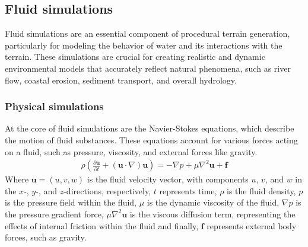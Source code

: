 






\subsection{Fluid simulations}
Fluid simulations are an essential component of procedural terrain generation, particularly for modeling the behavior of water and its interactions with the terrain. These simulations are crucial for creating realistic and dynamic environmental models that accurately reflect natural phenomena, such as river flow, coastal erosion, sediment transport, and overall hydrology.

\subsubsection{Physical simulations}
At the core of fluid simulations are the Navier-Stokes equations, which describe the motion of fluid substances. These equations account for various forces acting on a fluid, such as pressure, viscosity, and external forces like gravity. 
\begin{align}
    \rho \left( \frac{\partial \mathbf{u}}{\partial t} + (\mathbf{u} \cdot \nabla) \mathbf{u} \right) = -\nabla p + \mu \nabla^2 \mathbf{u} + \mathbf{f}
\end{align}
Where $\mathbf{u} = (u, v, w)$ is the fluid velocity vector, with components $u$, $v$, and $w$ in the $x$-, $y$-, and $z$-directions, respectively, $t$ represents time, $\rho$ is the fluid density, $p$ is the pressure field within the fluid, $\mu$ is the dynamic viscosity of the fluid, $\nabla p$ is the pressure gradient force, $\mu \nabla^2 \mathbf{u}$ is the viscous diffusion term, representing the effects of internal friction within the fluid and finally, $\mathbf{f}$ represents external body forces, such as gravity.


